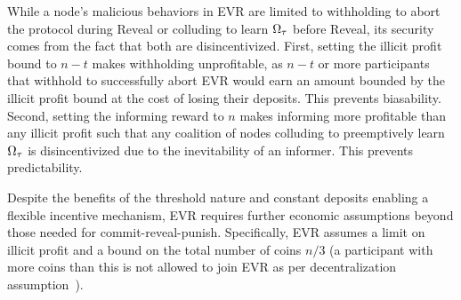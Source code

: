 While a node's malicious behaviors in EVR are limited to withholding to abort the protocol during Reveal or colluding to learn $\Omega_\tau$ before Reveal, its security comes from the fact that both are disincentivized. First, setting the illicit profit bound to $n - t$ makes withholding unprofitable, as $n - t$ or more participants that withhold to successfully abort EVR would earn an amount bounded by the illicit profit bound at the cost of losing their deposits. This prevents biasability. Second, setting the informing reward to $n$ makes informing more profitable than any illicit profit such that any coalition of nodes colluding to preemptively learn $\Omega_\tau$ is disincentivized due to the inevitability of an informer. This prevents predictability.

Despite the benefits of the threshold nature and constant deposits enabling a flexible incentive mechanism, EVR requires further economic assumptions beyond those needed for commit-reveal-punish. Specifically, EVR assumes a limit on illicit profit and a bound on the total number of coins $n / 3$ (a participant with more coins than this is not allowed to join EVR as per decentralization assumption~\cite{david2020economically}).
